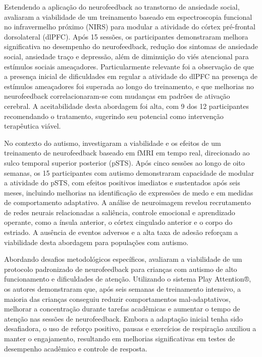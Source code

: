 Estendendo a aplicação do neurofeedback ao transtorno de ansiedade social,  avaliaram a viabilidade de um treinamento baseado em espectroscopia funcional no infravermelho próximo (NIRS) para modular a atividade do córtex pré-frontal dorsolateral (dlPFC). Após 15 sessões, os participantes demonstraram melhora significativa no desempenho do neurofeedback, redução dos sintomas de ansiedade social, ansiedade traço e depressão, além de diminuição do viés atencional para estímulos sociais ameaçadores. Particularmente relevante foi a observação de que a presença inicial de dificuldades em regular a atividade do dlPFC na presença de estímulos ameaçadores foi superada ao longo do treinamento, e que melhorias no neurofeedback correlacionaram-se com mudanças em padrões de ativação cerebral. A aceitabilidade desta abordagem foi alta, com 9 dos 12 participantes recomendando o tratamento, sugerindo seu potencial como intervenção terapêutica viável.

No contexto do autismo,  investigaram a viabilidade e os efeitos de um treinamento de neurofeedback baseado em fMRI em tempo real, direcionado ao sulco temporal superior posterior (pSTS). Após cinco sessões ao longo de oito semanas, os 15 participantes com autismo demonstraram capacidade de modular a atividade do pSTS, com efeitos positivos imediatos e sustentados após seis meses, incluindo melhorias na identificação de expressões de medo e em medidas de comportamento adaptativo. A análise de neuroimagem revelou recrutamento de redes neurais relacionadas a saliência, controle emocional e aprendizado operante, como a ínsula anterior, o córtex cingulado anterior e o corpo do estriado. A ausência de eventos adversos e a alta taxa de adesão reforçam a viabilidade desta abordagem para populações com autismo.

Abordando desafios metodológicos específicos,  avaliaram a viabilidade de um protocolo padronizado de neurofeedback para crianças com autismo de alto funcionamento e dificuldades de atenção. Utilizando o sistema Play Attention®, os autores demonstraram que, após seis semanas de treinamento intensivo, a maioria das crianças conseguiu reduzir comportamentos mal-adaptativos, melhorar a concentração durante tarefas acadêmicas e aumentar o tempo de atenção nas sessões de neurofeedback. Embora a adaptação inicial tenha sido desafiadora, o uso de reforço positivo, pausas e exercícios de respiração auxiliou a manter o engajamento, resultando em melhorias significativas em testes de desempenho acadêmico e controle de resposta.

